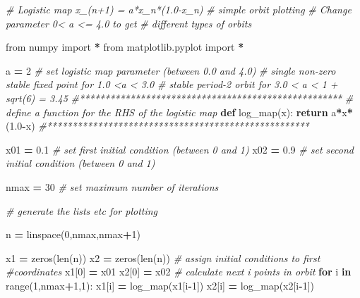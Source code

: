\documentclass[
  a4paper,
  oneside,
  final]{krantz}
\newenvironment{Shaded}{\begin{snugshade}}{\end{snugshade}}
\newcommand{\BuiltInTok}[1]{#1}
\newcommand{\CommentTok}[1]{\textcolor[rgb]{0.56,0.35,0.01}{\textit{#1}}}
\newcommand{\ControlFlowTok}[1]{\textcolor[rgb]{0.13,0.29,0.53}{\textbf{#1}}}
\newcommand{\DecValTok}[1]{\textcolor[rgb]{0.00,0.00,0.81}{#1}}
\newcommand{\FloatTok}[1]{\textcolor[rgb]{0.00,0.00,0.81}{#1}}
\newcommand{\ImportTok}[1]{#1}
\newcommand{\KeywordTok}[1]{\textcolor[rgb]{0.13,0.29,0.53}{\textbf{#1}}}
\newcommand{\NormalTok}[1]{#1}
\newcommand{\OperatorTok}[1]{\textcolor[rgb]{0.81,0.36,0.00}{\textbf{#1}}}
\theoremstyle{definition}
\theoremstyle{definition}
\theoremstyle{definition}
\theoremstyle{definition}
\theoremstyle{remark}
\begin{document}
\begin{Shaded}
\begin{Highlighting}[]


\CommentTok{\# Logistic map x\_(n+1) = a*x\_n*(1.0{-}x\_n) }
\CommentTok{\# simple orbit plotting}
\CommentTok{\# Change parameter 0\textless{} a \textless{}= 4.0 to get }
\CommentTok{\# different types of orbits}

\ImportTok{from}\NormalTok{ numpy }\ImportTok{import} \OperatorTok{*}
\ImportTok{from}\NormalTok{ matplotlib.pyplot }\ImportTok{import} \OperatorTok{*}

\NormalTok{a }\OperatorTok{=} \DecValTok{2}   
\CommentTok{\# set logistic map parameter (between 0.0 and 4.0)}
\CommentTok{\# single non{-}zero stable fixed point for 1.0 \textless{}a \textless{} 3.0}
\CommentTok{\# stable period{-}2 orbit for 3.0 \textless{} a \textless{} 1 + sqrt(6) = 3.45}
\CommentTok{\#****************************************************}
\CommentTok{\# define a function for the RHS of the logistic map}
\KeywordTok{def}\NormalTok{ log\_map(x):}
    \ControlFlowTok{return}\NormalTok{ a}\OperatorTok{*}\NormalTok{x}\OperatorTok{*}\NormalTok{(}\FloatTok{1.0}\OperatorTok{{-}}\NormalTok{x) }
\CommentTok{\#****************************************************}

\NormalTok{x01 }\OperatorTok{=} \FloatTok{0.1} \CommentTok{\# set first initial condition (between 0 and 1)}
\NormalTok{x02 }\OperatorTok{=} \FloatTok{0.9} \CommentTok{\# set second initial condition (between 0 and 1)}

\NormalTok{nmax }\OperatorTok{=} \DecValTok{30} \CommentTok{\# set maximum number of iterations}

\CommentTok{\# generate the lists etc for plotting}

\NormalTok{n }\OperatorTok{=}\NormalTok{ linspace(}\DecValTok{0}\NormalTok{,nmax,nmax}\OperatorTok{+}\DecValTok{1}\NormalTok{)}

\NormalTok{x1 }\OperatorTok{=}\NormalTok{ zeros(}\BuiltInTok{len}\NormalTok{(n))}
\NormalTok{x2 }\OperatorTok{=}\NormalTok{ zeros(}\BuiltInTok{len}\NormalTok{(n))}
\CommentTok{\# assign initial conditions to first}
\CommentTok{\#coordinates}
\NormalTok{x1[}\DecValTok{0}\NormalTok{] }\OperatorTok{=}\NormalTok{ x01  }
\NormalTok{x2[}\DecValTok{0}\NormalTok{] }\OperatorTok{=}\NormalTok{ x02  }
\CommentTok{\# calculate next i points in orbit}
\ControlFlowTok{for}\NormalTok{ i }\KeywordTok{in} \BuiltInTok{range}\NormalTok{(}\DecValTok{1}\NormalTok{,nmax}\OperatorTok{+}\DecValTok{1}\NormalTok{,}\DecValTok{1}\NormalTok{):}
\NormalTok{    x1[i] }\OperatorTok{=}\NormalTok{ log\_map(x1[i}\OperatorTok{{-}}\DecValTok{1}\NormalTok{])  }
\NormalTok{    x2[i] }\OperatorTok{=}\NormalTok{ log\_map(x2[i}\OperatorTok{{-}}\DecValTok{1}\NormalTok{])   }
    

\end{Highlighting}
\end{Shaded}
\end{document}

